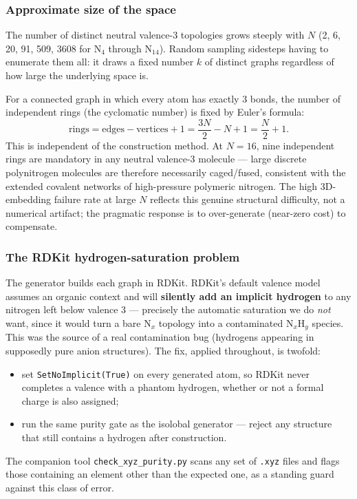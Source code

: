 \documentclass[11pt,a4paper]{article}
\begin{document}
\subsubsection{Approximate size of the space}

The number of distinct neutral valence-3 topologies grows steeply with $N$
(2, 6, 20, 91, 509, 3608 for N$_4$ through N$_{14}$). Random sampling
sidesteps having to enumerate them all: it draws a fixed number $k$ of
distinct graphs regardless of how large the underlying space is.

\begin{finding}
For a connected graph in which every atom has exactly 3 bonds, the number of
independent rings (the cyclomatic number) is fixed by Euler's formula:
\[
  \text{rings} = \text{edges} - \text{vertices} + 1 = \frac{3N}{2} - N + 1
    = \frac{N}{2} + 1.
\]
This is independent of the construction method. At $N=16$, nine independent
rings are mandatory in any neutral valence-3 molecule --- large discrete
polynitrogen molecules are therefore necessarily caged/fused, consistent with
the extended covalent networks of high-pressure polymeric nitrogen. The high
3D-embedding failure rate at large $N$ reflects this genuine structural
difficulty, not a numerical artifact; the pragmatic response is to
over-generate (near-zero cost) to compensate.
\end{finding}

\subsubsection{The RDKit hydrogen-saturation problem}

The generator builds each graph in RDKit. RDKit's default valence model
assumes an organic context and will \textbf{silently add an implicit hydrogen}
to any nitrogen left below valence 3 --- precisely the automatic saturation
we do \emph{not} want, since it would turn a bare N$_x$ topology into a
contaminated N$_x$H$_y$ species. This was the source of a real contamination
bug (hydrogens appearing in supposedly pure anion structures). The fix, applied
throughout, is twofold:
\begin{itemize}[itemsep=2pt]
  \item set \texttt{SetNoImplicit(True)} on every generated atom, so RDKit
    never completes a valence with a phantom hydrogen, whether or not a formal
    charge is also assigned;
  \item run the same purity gate as the isolobal generator --- reject any
    structure that still contains a hydrogen after construction.
\end{itemize}
The companion tool \texttt{check\_xyz\_purity.py} scans any set of
\texttt{.xyz} files and flags those containing an element other than the
expected one, as a standing guard against this class of error.
\end{document}
